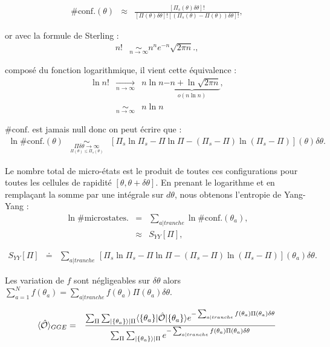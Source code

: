	\begin{eqnarray}
		\# \mbox{conf.}(\theta) & \approx  & \frac{[ \Pi_s ( \theta ) \delta \theta ] ! }{ [ \Pi ( \theta ) \delta \theta ] ! [( \Pi_s ( \theta ) - \Pi ( \theta ) )  \delta \theta ] ! } , 	
	\end{eqnarray}
	
	or avec la formule de Sterling :  
	\begin{eqnarray}
		n! & \underset{n \to \infty}{\sim} n^n e^{-n} \sqrt{2\pi n}.,
	\end{eqnarray}
	
	composé du fonction logarithmique, il vient cette équivalence : 
	\begin{eqnarray}
		\ln n! & \underset{n \to \infty}{\rightarrow} & n \ln n \underbrace{- n + \ln \sqrt{2 \pi n }}_{o \left ( n \ln n \right ) } ,\\
		&  \underset{n \to \infty}{\sim} & n \ln n  
	\end{eqnarray}
	
	$\# \mbox{conf.}$ est jamais null donc on peut écrire que : 
\begin{eqnarray}
    \ln \# \mbox{conf.}(\theta) & \underset{\underset{\Pi (\theta )\leq  \Pi_s (\theta )}{\Pi \delta \theta  \to \infty}}{\sim}   & [ \Pi_s\ln \Pi_s - \Pi \ln \Pi - ( \Pi_s - \Pi ) \ln ( \Pi_s - \Pi) ] (\theta )\delta \theta .
\end{eqnarray}

Le nombre total de micro-états est le produit de toutes ces configurations pour toutes les cellules de rapidité $[\theta, \theta + \delta \theta]$. En prenant le logarithme et en remplaçant la somme par une intégrale sur $d \theta$, nous obtenons l'entropie de Yang-Yang :
\begin{eqnarray}
    \ln \# \mbox{microstates.} & = & \sum_{a\vert tranche} \ln \# \mbox{conf.}(\theta_a), \\
    & \approx &   S_{YY} [ \Pi ] , 	
\end{eqnarray}

\begin{eqnarray}
    S_{YY}[\Pi] & \doteq & \sum_{a\vert tranche} \, [ \Pi_s\ln \Pi_s - \Pi \ln \Pi - ( \Pi_s - \Pi ) \ln ( \Pi_s - \Pi ) ] (\theta_a) \delta \theta .
\end{eqnarray}
	
	Les variation de $f$ sont négligeables sur $\delta \theta $ alors  $\sum_{a = 1}^N  f(\theta_a) = \sum_{a \vert tranche } f(\theta_a) \Pi( \theta_a)\delta \theta$.
	
	
	\begin{eqnarray}
		\langle \hat{\mathbf{\mathcal{O}}} \rangle_{GGE} & =  & \frac{ \sum_{\Pi} \sum_{\vert \{\theta_a \}\rangle \vert \Pi } \langle  \{ \theta_a\}  \vert   \hat{\mathbf{\mathcal{O}}} \vert \{ \theta_a\} \rangle e^{- \sum_{a \vert tranche} f(\theta_a) \Pi ( \theta_a )  \delta \theta}    }{\sum_{\Pi} \sum_{\vert \{\theta_a \}\rangle \vert \Pi }  e^{- \sum_{a \vert tranche }  f(\theta_a) \Pi ( \theta_a ) \delta \theta } }
	\end{eqnarray}
	
